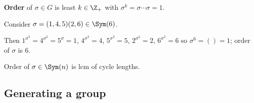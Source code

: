 \begin{slide}
    \begin{definition}[order]
        \vspace{0pt}
        \textbf{Order} of $\sigma \in G$ is least $k \in \Z_+$ with $\sigma^k = \sigma \dotsb \sigma = 1$.
    \end{definition} \pause

    \begin{example}
        \vspace{0pt}
        Consider $\sigma = (1,4,5)(2,6) \in \Sym(6)$.
        \begin{center}
        \end{center} \pause
        Then $1^{\sigma^3} = 4^{\sigma^2} = 5^\sigma = 1$, \pause $4^{\sigma^3} = 4$, $5^{\sigma^3} = 5$, $2^{\sigma^2} = 2$, $6^{\sigma^2} = 6$ so \pause $\sigma^6 = () = 1$; order of $\sigma$ is 6. \pause
    \end{example}

    \begin{proposition}
        Order of $\sigma \in \Sym(n)$ is lcm of cycle lengths.
    \end{proposition}
\end{slide}

\subsection{Generating a group}

